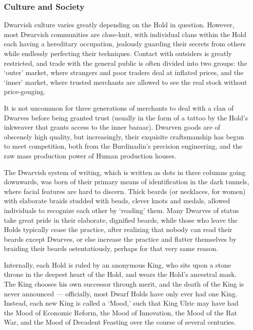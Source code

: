 \documentclass[oneside,11pt,english]{book}
\begin{document}
\subsubsection*{Culture and Society}
Dwarvish culture varies greatly depending on the Hold in question. However, most
Dwarvish communities are close-knit, with individual clans within the Hold each
having a hereditary occupation, jealously guarding their secrets from others
while endlessly perfecting their techniques. Contact with outsiders is greatly
restricted, and trade with the general public is often divided into two groups:
the ‘outer’ market, where strangers and poor traders deal at inflated prices,
and the ‘inner’ market, where trusted merchants are allowed to see the real
stock without price-gouging.

It is not uncommon for three generations of merchants to deal with a clan of
Dwarves before being granted trust (usually in the form of a tattoo by the
Hold's inkweaver that grants access to the inner bazaar). Dwarven goods are of
obscenely high quality, but increasingly, their exquisite craftsmanship has
begun to meet competition, both from the Burdinadin's precision engineering, and
the raw mass production power of Human production houses.

The Dwarvish system of writing, which is written as dots in three columns going
downwards, was born of their primary means of identification in the dark
tunnels, where facial features are hard to discern. Thick beards (or necklaces,
for women) with elaborate braids studded with beads, clever knots and medals,
allowed individuals to recognize each other by ‘reading’ them. Many Dwarves of
status take great pride in their elaborate, dignified beards, while those who
leave the Holds typically cease the practice, after realizing that nobody can
read their beards except Dwarves, or else increase the practice and flatter
themselves by braiding their beards ostentatiously, perhaps for that very same
reason.

Internally, each Hold is ruled by an anonymous King, who sits upon a stone
throne in the deepest heart of the Hold, and wears the Hold's ancestral mask.
The King chooses his own successor through merit, and the death of the King is
never announced — officially, most Dwarf Holds have only ever had one King.
Instead, each new King is called a ‘Mood,’ such that King Ulric may have had the
Mood of Economic Reform, the Mood of Innovation, the Mood of the Rat War, and
the Mood of Decadent Feasting over the course of several centuries.
\end{document}
